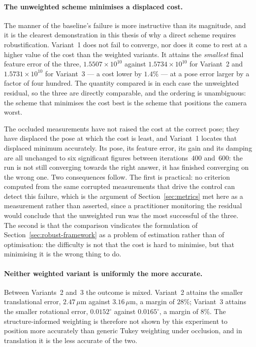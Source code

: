 \paragraph{The unweighted scheme minimises a displaced cost.}
The manner of the baseline's failure is more instructive than its magnitude,
and it is the clearest demonstration in this thesis of why a direct scheme
requires robustification. Variant~1 does not fail to converge, nor does it
come to rest at a higher value of the cost than the weighted variants. It
attains the \emph{smallest} final feature error of the three,
$1.5507\times10^{10}$ against $1.5734\times10^{10}$ for Variant~2 and
$1.5731\times10^{10}$ for Variant~3 --- a cost lower by $1.4\%$ --- at a pose
error larger by a factor of four hundred. The quantity compared is in each
case the unweighted residual, so the three are directly comparable, and the
ordering is unambiguous: the scheme that minimises the cost best is the scheme
that positions the camera worst.

The occluded measurements have not raised the cost at the correct pose; they
have displaced the pose at which the cost is least, and Variant~1 locates that
displaced minimum accurately. Its pose, its feature error, its gain and its
damping are all unchanged to six significant figures between iterations~$400$
and~$600$: the run is not still converging towards the right answer, it has
finished converging on the wrong one. Two consequences follow. The first is
practical: no criterion computed from the same corrupted measurements that
drive the control can detect this failure, which is the argument of
Section~\ref{sec:metrics} met here as a measurement rather than asserted,
since a practitioner monitoring the residual would conclude that the
unweighted run was the most successful of the three. The second is that the
comparison vindicates the formulation of Section~\ref{sec:robust-framework} as
a problem of estimation rather than of optimisation: the difficulty is not
that the cost is hard to minimise, but that minimising it is the wrong thing
to do.

\paragraph{Neither weighted variant is uniformly the more accurate.}
Between Variants~2 and~3 the outcome is mixed. Variant~2 attains the smaller
translational error, $2.47\,\mu\mathrm{m}$ against $3.16\,\mu\mathrm{m}$, a
margin of $28\%$; Variant~3 attains the smaller rotational error,
$0.0152^{\circ}$ against $0.0165^{\circ}$, a margin of $8\%$. The
structure-informed weighting is therefore not shown by this experiment to
position more accurately than generic Tukey weighting under occlusion, and in
translation it is the less accurate of the two.

